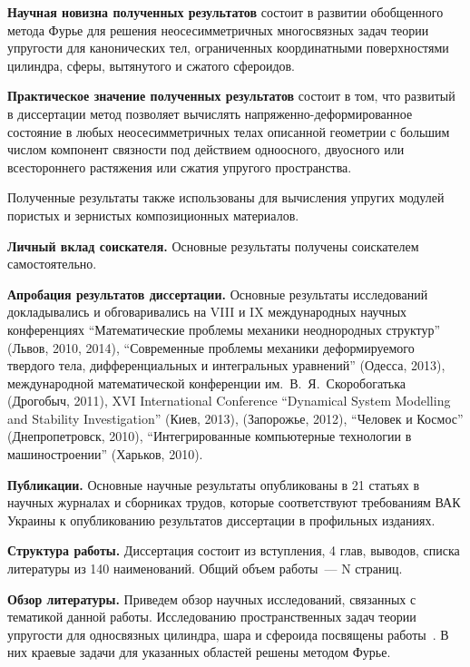 {\bf Научная новизна полученных результатов} состоит в развитии обобщенного метода Фурье для решения неосесимметричных многосвязных задач теории упругости для канонических тел, ограниченных координатными поверхностями цилиндра, сферы, вытянутого и сжатого сфероидов.

{\bf Практическое значение полученных результатов} состоит в том, что развитый в диссертации метод позволяет вычислять на\-пряжен\-но-де\-форми\-ро\-ван\-ное состояние в любых неосесимметричных телах описанной геометрии с большим числом компонент связности под действием одноосного, двуосного или всестороннего растяжения или сжатия упругого пространства.

Полученные результаты также использованы для вычисления упругих модулей пористых и зернистых композиционных материалов.

{\bf Личный вклад соискателя.} Основные результаты получены соискателем самостоятельно.

{\bf Апробация результатов диссертации.} Основные результаты исследований докладывались и обговаривались на VIII и IX международных научных конференциях ``Математические проблемы механики неоднородных структур'' (Львов, 2010, 2014), ``Современные проблемы механики деформируемого твердого тела, дифференциальных и интегральных уравнений'' (Одесса, 2013), международной математической конференции им.~В.~Я.~Скоробогатька (Дрогобыч, 2011), XVI International Conference ``Dynamical System Modelling  and Stability Investigation'' (Киев, 2013), (Запорожье, 2012), ``Человек и Космос'' (Днепропетровск, 2010), ``Интегрированные компьютерные технологии в машиностроении'' (Харьков, 2010).

{\bf Публикации.} Основные научные результаты опубликованы в 21 статьях в научных журналах и сборниках трудов, которые соответствуют требованиям ВАК Украины к опубликованию результатов диссертации в профильных изданиях. 

{\bf Структура работы.} Диссертация состоит из вступления, 4 глав, выводов, списка литературы из 140 наименований. Общий объем работы~--- N страниц.

{\bf Обзор литературы.} Приведем обзор научных исследований, связанных с тематикой данной работы. Исследованию пространственных задач теории упругости для односвязных цилиндра, шара и сфероида посвящены работы~\cite{Abramian, Andreev, Valov, Volpert1977, Volpert1967, Gomilko, Grinchenko1965, Grinchenko1967, Grinchenko1985, Grinchenko1978, Lur'e, Podilchuk1967, Podilchuk1984, Prokopov, Tokovyy, Ulitko, Chen1978-1, Chen1978-2, Edwards, Zhong, Zureick1989, Zureick1988, Ambartsumian, Arutynian, Kaufman, Kolesov, Meleshko}. В них краевые задачи для указанных областей решены методом Фурье.

